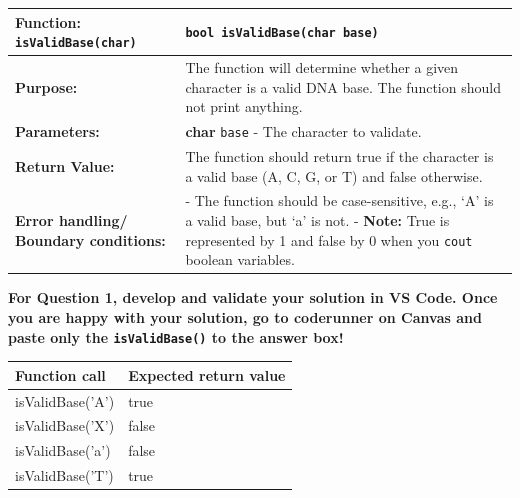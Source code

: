 \begin{longtable}{|p{1.7in}|p{4.0in}|}
    \hline
    \textbf{Function:} \texttt{isValidBase(char)}
        & 
        \texttt{bool isValidBase(char base)}
        \\ \hline
    \textbf{Purpose:} 
        & 
        The function will determine whether a given character is a valid DNA base. The function should not print anything. 
        \\ \hline
    
    \textbf{Parameters:} 
        & 
        \textbf{char} \texttt{base} - The character to validate. 
        \\ \hline
    
    \textbf{Return Value:} 
        & 
        The function should return true if the character is a valid base (A, C, G, or T) and false otherwise. 
        \\ \hline
    \textbf{Error handling/ Boundary conditions:}
        &
        - The function should be case-sensitive, e.g., `A' is a valid base, but `a' is not. \newline
        - \textbf{Note:} True is represented by 1 and false by 0 when you \texttt{cout} boolean variables.
        \\ \hline
\end{longtable}

\textbf{For Question 1, develop and validate your solution in VS Code. Once you are happy with your solution, go to coderunner on Canvas and paste only the \texttt{isValidBase()} to the answer box!} 

\begin{sampleProject}
    \hspace{0pt}
    \begin{longtable}{|p{2.0in}|p{2.0in}|}
        \hline
        \textbf{Function call}
            & 
            \textbf{Expected return value}
            \\ \hline
        
        isValidBase('A')
            & 
            true
            \\ \hline
        
        isValidBase('X')
            & 
            false
            \\ \hline
        
        isValidBase('a')
            & 
            false
            \\ \hline

        isValidBase('T')
            & 
            true
            \\ \hline
    \end{longtable}

\end{sampleProject}

